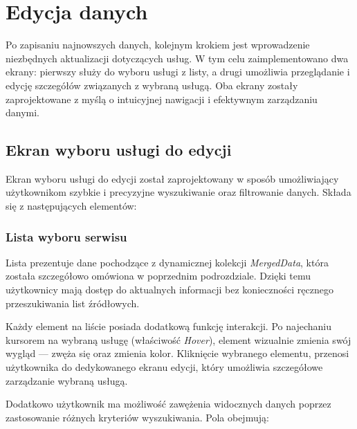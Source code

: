 \section{Edycja danych}

Po zapisaniu najnowszych danych, kolejnym krokiem jest wprowadzenie niezbędnych aktualizacji dotyczących usług. W tym celu zaimplementowano dwa ekrany: pierwszy służy do wyboru usługi z listy, a drugi umożliwia przeglądanie i edycję szczegółów związanych z wybraną usługą. Oba ekrany zostały zaprojektowane z myślą o intuicyjnej nawigacji i efektywnym zarządzaniu danymi.

\subsection{Ekran wyboru usługi do edycji}


Ekran wyboru usługi do edycji został zaprojektowany w sposób umożliwiający użytkownikom szybkie i precyzyjne wyszukiwanie oraz filtrowanie danych. Składa się z następujących elementów:

\subsubsection*{Lista wyboru serwisu}

Lista prezentuje dane pochodzące z dynamicznej kolekcji \emph{MergedData}, która została szczegółowo omówiona w poprzednim podrozdziale. Dzięki temu użytkownicy mają dostęp do aktualnych informacji bez konieczności ręcznego przeszukiwania list źródłowych.

Każdy element na liście posiada dodatkową funkcję interakcji. Po najechaniu kursorem na wybraną usługę (właściwość \emph{Hover}), element wizualnie zmienia swój wygląd — zwęża się oraz zmienia kolor. Kliknięcie wybranego elementu, przenosi użytkownika do dedykowanego ekranu edycji, który umożliwia szczegółowe zarządzanie wybraną usługą.

Dodatkowo użytkownik ma możliwość zawężenia widocznych danych poprzez zastosowanie różnych kryteriów wyszukiwania. Pola obejmują:

